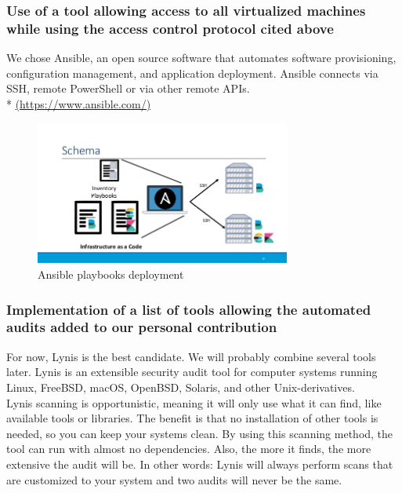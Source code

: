 \subsubsection{Use of a tool allowing access to all virtualized machines while using the access control protocol cited above}
\vspace{0.5cm}

We chose Ansible, an open source software that automates software
provisioning, configuration management, and application deployment.
Ansible connects via SSH, remote PowerShell or via other remote APIs.\\ *
\url{(https://www.ansible.com/)}

\begin{figure}[!h]
  \centering
  \includegraphics[width=0.75\textwidth]{images/ansible-example.jpg}
  \caption{Ansible playbooks deployment}
  \label{Ansible}
\end{figure}

\pagebreak

\subsubsection{Implementation of a list of tools allowing the automated audits added to our
  personal contribution}

For now, Lynis is the best candidate. We will probably combine several tools later.
Lynis is an extensible security audit tool for computer systems
running Linux, FreeBSD, macOS, OpenBSD, Solaris, and other
Unix-derivatives.
\\

Lynis scanning is opportunistic, meaning it will only use what it can find, like available tools or libraries. The benefit is that no installation of other tools is needed, so you can keep your systems clean.
By using this scanning method, the tool can run with almost no dependencies. Also, the more it finds, the more extensive the audit will be. In other words: Lynis will always perform scans that are customized to your system and two audits will never be the same.
\\

